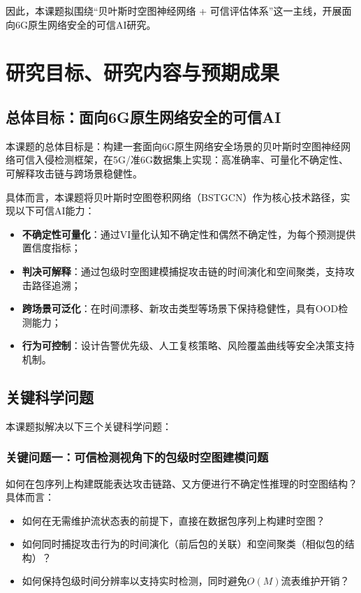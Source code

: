 因此，本课题拟围绕``贝叶斯时空图神经网络 + 可信评估体系''这一主线，开展面向6G原生网络安全的可信AI研究。

\section{研究目标、研究内容与预期成果}

\subsection{总体目标：面向6G原生网络安全的可信AI}

本课题的总体目标是：构建一套面向6G原生网络安全场景的贝叶斯时空图神经网络可信入侵检测框架，在5G/准6G数据集上实现：高准确率、可量化不确定性、可解释攻击链与跨场景稳健性。

具体而言，本课题将贝叶斯时空图卷积网络（BSTGCN）作为核心技术路径，实现以下可信AI能力：

\begin{itemize}
  \item \textbf{不确定性可量化}：通过VI量化认知不确定性和偶然不确定性，为每个预测提供置信度指标；
  \item \textbf{判决可解释}：通过包级时空图建模捕捉攻击链的时间演化和空间聚类，支持攻击路径追溯；
  \item \textbf{跨场景可泛化}：在时间漂移、新攻击类型等场景下保持稳健性，具有OOD检测能力；
  \item \textbf{行为可控制}：设计告警优先级、人工复核策略、风险覆盖曲线等安全决策支持机制。
\end{itemize}

\subsection{关键科学问题}

本课题拟解决以下三个关键科学问题：

\subsubsection{关键问题一：可信检测视角下的包级时空图建模问题}

如何在包序列上构建既能表达攻击链路、又方便进行不确定性推理的时空图结构？具体而言：

\begin{itemize}
  \item 如何在无需维护流状态表的前提下，直接在数据包序列上构建时空图？
  \item 如何同时捕捉攻击行为的时间演化（前后包的关联）和空间聚类（相似包的结构）？
  \item 如何保持包级时间分辨率以支持实时检测，同时避免$O(M)$流表维护开销？
\end{itemize}

